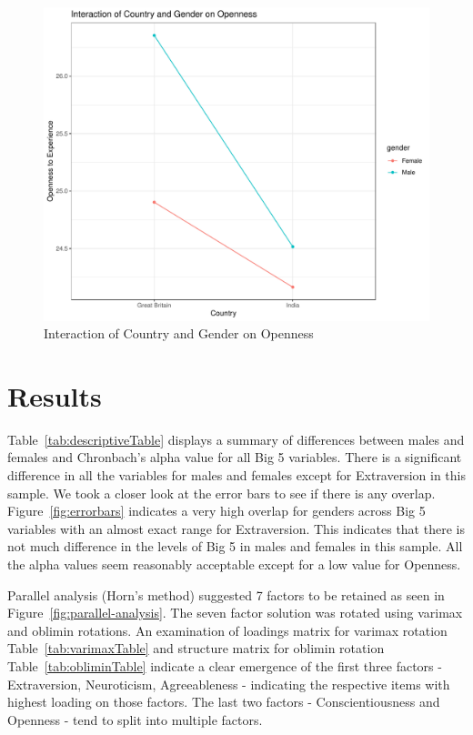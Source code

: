\documentclass[
  english,
  man, fleqn, noextraspace]{apa6}
\begin{document}
\begin{figure}
\centering
\includegraphics{final_project_files/figure-latex/interactionplot-1.pdf}
\caption{\label{fig:interactionplot}Interaction of Country and Gender on Openness}
\end{figure}

\hypertarget{results}{%
\section{Results}\label{results}}

Table~\ref{tab:descriptiveTable} displays a summary of differences between males and females and Chronbach's alpha value for all Big 5 variables. There is a significant difference in all the variables for males and females except for Extraversion in this sample. We took a closer look at the error bars to see if there is any overlap. Figure~\ref{fig:errorbars} indicates a very high overlap for genders across Big 5 variables with an almost exact range for Extraversion. This indicates that there is not much difference in the levels of Big 5 in males and females in this sample. All the alpha values seem reasonably acceptable except for a low value for Openness.

Parallel analysis (Horn's method) suggested 7 factors to be retained as seen in Figure~\ref{fig:parallel-analysis}. The seven factor solution was rotated using varimax and oblimin rotations. An examination of loadings matrix for varimax rotation Table~\ref{tab:varimaxTable} and structure matrix for oblimin rotation Table~\ref{tab:obliminTable} indicate a clear emergence of the first three factors -Extraversion, Neuroticism, Agreeableness - indicating the respective items with highest loading on those factors. The last two factors - Conscientiousness and Openness - tend to split into multiple factors.
\end{document}
